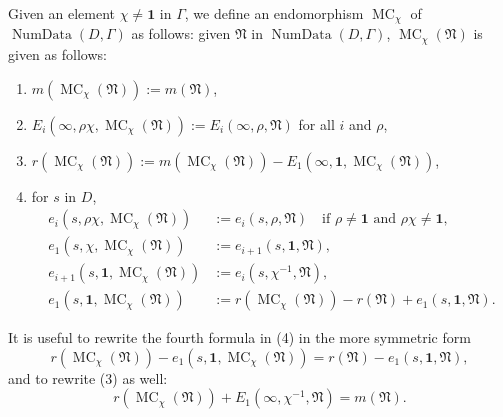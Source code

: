 Given an element \(\chi\ne\mathbf{1}\) in \(\Gamma\), we define an endomorphism \(\operatorname{MC}_\chi\) of \(\operatorname{NumData}(D,\Gamma)\) as follows: given \(\mathfrak{N}\) in \(\operatorname{NumData}(D,\Gamma)\), \(\operatorname{MC}_\chi(\mathfrak{N})\) is given as follows:
\begin{enumerate}[label=(\arabic*)]
\item \(m(\operatorname{MC}_\chi(\mathfrak{N})):=m(\mathfrak{N})\),
\item \(E_i(\infty,\rho\chi,\operatorname{MC}_\chi(\mathfrak{N})):=E_i(\infty,\rho,\mathfrak{N})\) for all \(i\) and \(\rho\),
\item \(r(\operatorname{MC}_\chi(\mathfrak{N})):=m(\operatorname{MC}_\chi(\mathfrak{N}))-E_1(\infty,\mathbf{1},\operatorname{MC}_\chi(\mathfrak{N}))\),
\item for \(s\) in \(D\),
\[
\begin{aligned}
e_i(s,\rho\chi,\operatorname{MC}_\chi(\mathfrak{N}))&:=e_i(s,\rho,\mathfrak{N})\quad\text{if }\rho\ne\mathbf{1}\text{ and }\rho\chi\ne\mathbf{1},\\
e_1(s,\chi,\operatorname{MC}_\chi(\mathfrak{N}))&:=e_{i+1}(s,\mathbf{1},\mathfrak{N}),\\
e_{i+1}(s,\mathbf{1},\operatorname{MC}_\chi(\mathfrak{N}))&:=e_i(s,\chi^{-1},\mathfrak{N}),\\
e_1(s,\mathbf{1},\operatorname{MC}_\chi(\mathfrak{N}))&:=r(\operatorname{MC}_\chi(\mathfrak{N}))-r(\mathfrak{N})+e_1(s,\mathbf{1},\mathfrak{N}).
\end{aligned}
\]
\end{enumerate}
It is useful to rewrite the fourth formula in (4) in the more symmetric form
\[
r(\operatorname{MC}_\chi(\mathfrak{N}))-e_1(s,\mathbf{1},\operatorname{MC}_\chi(\mathfrak{N}))
=r(\mathfrak{N})-e_1(s,\mathbf{1},\mathfrak{N}),
\]
and to rewrite (3) as well:
\[
r(\operatorname{MC}_\chi(\mathfrak{N}))+E_1(\infty,\chi^{-1},\mathfrak{N})=m(\mathfrak{N}).
\]

